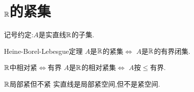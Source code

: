 \section{\texorpdfstring{$\mathbb{R}$}{R}的紧集}

记号约定:$A$是实直线$\mathbb{R}$的子集.

\begin{theorem}{Heine-Borel-Lebesgue定理}{}
	$A$是$\mathbb{R}$的紧集$\iff$ $A$是$\mathbb{R}$的有界闭集.
\end{theorem}

\begin{corollary}{$\mathbb{R}$中相对紧$\iff$有界}{}
	$A$是$\mathbb{R}$的相对紧集$\iff$ $A$按$\leqslant$有界.
\end{corollary}

\begin{corollary}{$\mathbb{R}$局部紧但不紧}{}
	实直线是局部紧空间,但不是紧空间.
\end{corollary}